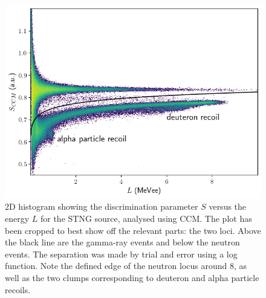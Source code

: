 \documentclass[11pt]{article}
\numberwithin{equation}{section}
\numberwithin{figure}{section}
\numberwithin{table}{section}
\begin{document}
\begin{figure}[H]
    \begin{center}
        \includegraphics[scale=0.75]{Plots/CCM_STNG_hist2d.png}
        \caption{2D histogram showing the discrimination parameter $S$ versus the energy $L$ for the STNG source, analysed using CCM. The plot has been cropped to best show off the relevant parts: the two loci. Above the black line are the gamma-ray events and below the neutron events. The separation was made by trial and error using a log function. Note the defined edge of the neutron locus around \SI{8}{\mevee}, as well as the two clumps corresponding to deuteron and alpha particle recoils.}
        \label{fig:CCM_STNG_hist2d}
    \end{center}
\end{figure}
\end{document}

